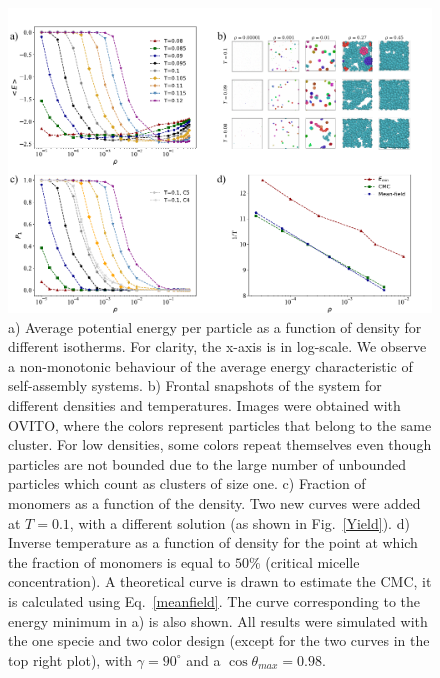 \documentclass[a4paper, amsfonts, amssymb, amsmath, reprint, showkeys, nofootinbib, oneside]{revtex4-1}
\begin{document}
\begin{figure}[t]
	\includegraphics{fig5.pdf}
	\caption{\label{Energy} a) Average potential energy per particle as a function of density for different isotherms. For clarity, the x-axis is in log-scale. We observe a non-monotonic behaviour of the average energy characteristic of self-assembly systems. b) Frontal snapshots of the system for different densities and temperatures. Images were obtained with OVITO, where the colors represent particles that belong to the same cluster. For low densities, some colors repeat themselves even though particles are not bounded due to the large number of unbounded particles which count as clusters of size one. c) Fraction of monomers as a function of the density. Two new curves were added at $T=0.1$, with a different solution (as shown in Fig.~\ref{Yield}). d) Inverse temperature as a function of density for the point at which the fraction of monomers is equal to $50\%$ (critical micelle concentration). A theoretical curve is drawn to estimate the CMC, it is calculated using Eq.~\eqref{meanfield}. The curve corresponding to the energy minimum in a) is also shown. All results were simulated with the one specie and two color design (except for the two curves in the top right plot), with $\gamma=90^\circ$ and a $\cos\theta_{max}=0.98$.}
\end{figure}
\end{document}
